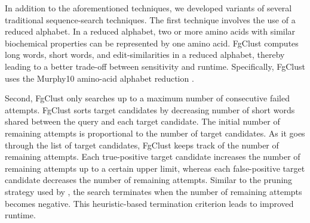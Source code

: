 \documentclass{bioinfo}
\begin{document}
In addition to the aforementioned techniques, we developed variants of several traditional sequence-search techniques.
The first technique involves the use of a reduced alphabet. 
In a reduced alphabet, two or more amino acids with similar biochemical properties can be represented by one amino acid.
FgClust computes long words, 
	short words,
	and edit-similarities in a reduced alphabet, thereby leading to a better trade-off between sensitivity and runtime.
Specifically, FgClust uses the Murphy10 amino-acid alphabet reduction \citep{murphy2000simplified}.

Second, FgClust only searches up to a maximum number of consecutive failed attempts.
FgClust sorts target candidates by decreasing number of 
short words
shared between the query and each target candidate.
The initial number of remaining attempts is proportional to the number of target candidates.
As it goes through the list of target candidates, FgClust keeps track of the number of remaining attempts.
Each true-positive target candidate increases the number of remaining attempts up to a certain upper limit, whereas each false-positive target candidate decreases the number of remaining attempts.
Similar to the pruning strategy used by \citet{edgar2010search}, the search terminates when the number of remaining attempts becomes negative.
This heuristic-based termination criterion leads to improved runtime.
\end{document}
